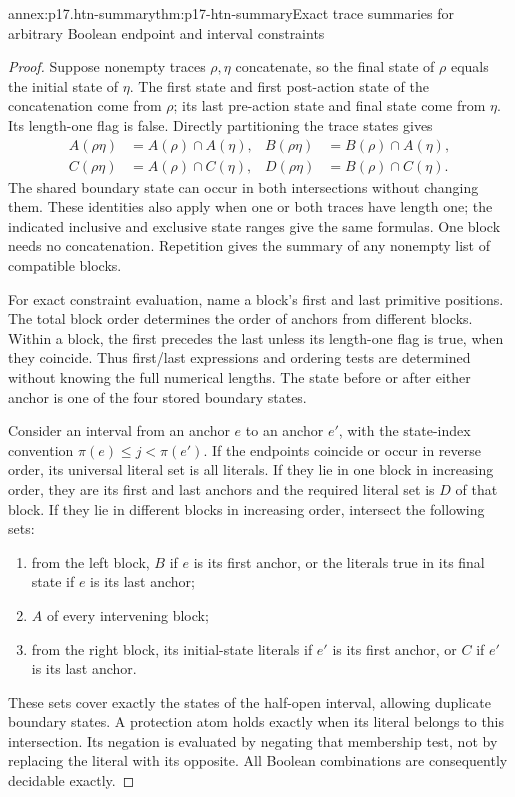 \begin{annexitem}{annex:p17.htn-summary}{thm:p17-htn-summary}{Exact trace summaries for arbitrary Boolean endpoint and interval constraints}
\begin{proof}
Suppose nonempty traces \(\rho,\eta\) concatenate, so the final state of
\(\rho\) equals the initial state of \(\eta\). The first state and first
post-action state of the concatenation come from \(\rho\); its last
pre-action state and final state come from \(\eta\). Its length-one flag
is false. Directly partitioning the trace states gives
\[
 \begin{aligned}
 A(\rho\eta)&=A(\rho)\cap A(\eta),&
 B(\rho\eta)&=B(\rho)\cap A(\eta),\\
 C(\rho\eta)&=A(\rho)\cap C(\eta),&
 D(\rho\eta)&=B(\rho)\cap C(\eta).
 \end{aligned}
\]
The shared boundary state can occur in both intersections without changing
them. These identities also apply when one or both traces have length one;
the indicated inclusive and exclusive state ranges give the same formulas.
One block needs no concatenation. Repetition gives the summary of any
nonempty list of compatible blocks.

For exact constraint evaluation, name a block's first and last primitive
positions. The total block order determines the order of anchors from
different blocks. Within a block, the first precedes the last unless its
length-one flag is true, when they coincide. Thus first/last expressions and
ordering tests are determined without knowing the full numerical lengths.
The state before or after either anchor is one of the four stored boundary
states.

Consider an interval from an anchor \(e\) to an anchor \(e'\), with the
state-index convention \(\pi(e)\leq j<\pi(e')\). If the endpoints coincide
or occur in reverse order, its universal literal set is all literals. If
they lie in one block in increasing order, they are its first and last
anchors and the required literal set is \(D\) of that block. If they lie
in different blocks in increasing order, intersect the following sets:
\begin{enumerate}
\item from the left block, \(B\) if \(e\) is its first anchor, or the
      literals true in its final state if \(e\) is its last anchor;
\item \(A\) of every intervening block;
\item from the right block, its initial-state literals if \(e'\) is its
      first anchor, or \(C\) if \(e'\) is its last anchor.
\end{enumerate}
These sets cover exactly the states of the half-open interval, allowing
duplicate boundary states. A protection atom holds exactly when its literal
belongs to this intersection. Its negation is evaluated by negating that
membership test, not by replacing the literal with its opposite. All Boolean
combinations are consequently decidable exactly.


\end{proof}
\end{annexitem}
